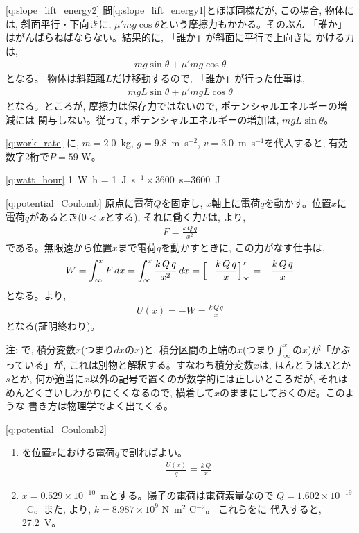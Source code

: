 % 
\ref{q:slope_lift_energy2}
問\ref{q:slope_lift_energy1}とほぼ同様だが, この場合, 物体には, 
斜面平行・下向きに, $\mu'mg\cos\theta$という摩擦力もかかる。そのぶん
「誰か」はがんばらねばならない。結果的に, 「誰か」が斜面に平行で上向きに
かける力は, 
\begin{eqnarray}mg\sin\theta+\mu'mg\cos\theta\end{eqnarray}
となる。
物体は斜距離$L$だけ移動するので, 「誰か」が行った仕事は, 
\begin{eqnarray}mgL\sin\theta+\mu'mgL\cos\theta\end{eqnarray}
となる。ところが, 摩擦力は保存力ではないので, ポテンシャルエネルギーの増減には
関与しない。従って, ポテンシャルエネルギーの増加は, $mgL\sin\theta$。\mv

\ref{q:work_rate}
に, $m=2.0$~kg, $g=9.8$~m~s$^{-2}$, $v=3.0$~m~s$^{-1}$を代入すると, 
有効数字2桁で$P= 59$ W。
\mv

%
\ref{q:watt_hour}
1~W~h = 1~J~s$^{-1} \times 3600$~s=3600~J
\mv


\ref{q:potential_Coulomb}
原点に電荷$Q$を固定し, $x$軸上に電荷$q$を動かす。位置$x$に電荷$q$があるとき($0<x$とする), 
それに働く力$F$は, より, 
\begin{eqnarray}
F=\frac{k\,Q\,q}{x^2}
\end{eqnarray}
である。無限遠から位置$x$まで電荷$q$を動かすときに, この力がなす仕事は, 
\begin{eqnarray}
W=\int_{\infty}^{x}F\,dx=\int_{\infty}^{x}\frac{k\,Q\,q}{x^2}\,dx
=\Bigl[-\frac{k\,Q\,q}{x}\Bigr]_{\infty}^{x}=-\frac{k\,Q\,q}{x}\nonumber\\\label{eq:potential_Coulomb00}
\end{eqnarray}
となる。より, 
\begin{eqnarray}
U(x)=-W=\frac{k\,Q\,q}{x}
\end{eqnarray}
となる(証明終わり)。\mv

{\small 注: で, 積分変数$x$(つまり$dx$の$x$)と, 
積分区間の上端の$x$(つまり$\int_{\infty}^x$の$x$)が「かぶっている」が, 
これは別物と解釈する。すなわち積分変数$x$は, ほんとうは$X$とか$s$とか, 
何か適当に$x$以外の記号で置くのが数学的には正しいところだが, それは
めんどくさいしわかりにくくなるので, 横着して$x$のままにしておくのだ。このような
書き方は物理学でよく出てくる。\mv}

\ref{q:potential_Coulomb2}　
\begin{enumerate}
\item {}を位置$x$における電荷$q$で割ればよい。
\begin{eqnarray}
\frac{U(x)}{q}=\frac{k\,Q}{x}\label{eq:voltage_Coulomb}
\end{eqnarray}
\item $x=0.529\times 10^{-10}$~mとする。陽子の電荷は電荷素量なので
$Q=1.602\times 10^{-19}$~C。また, より, 
$k=8.987\times 10^{9}$ N~m$^2$ C$^{-2}$。
これらをに
代入すると, 27.2~V。
\end{enumerate}

